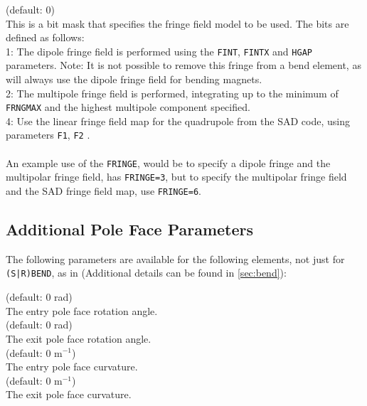 \begin{madlist}
   (default: 0) \\
  This is a bit mask that specifies the fringe field model to be used.
  The bits are defined as follows:\\

  1: The dipole fringe field is performed using the \texttt{FINT}, 
  \texttt{FINTX} and \texttt{HGAP} parameters. 
  Note: It is not possible to remove this fringe from a bend element, as \ptc
  will always use the dipole fringe field for bending magnets.\\

  2: The multipole fringe field is performed, integrating up to the minimum of 
  \texttt{FRNGMAX} and the highest multipole component specified.\\

  4: Use the linear fringe field map for the quadrupole from the SAD code, 
  using parameters \texttt{F1}, \texttt{F2} \cite{sad_quad_2022}. \\ \\


  An example use of the \texttt{FRINGE}, would be to specify a dipole fringe and 
  the multipolar fringe field, has \texttt{FRINGE=3}, but to specify the multipolar
  fringe field and the SAD fringe field map, use \texttt{FRINGE=6}.

\end{madlist}

\subsection{Additional Pole Face Parameters}

The following parameters are available for the following elements, 
not just for \texttt{(S|R)BEND}, as in \madx 
(Additional details can be found in \ref{sec:bend}):


\begin{madlist}
   (default: 0 rad) \\
  The entry pole face rotation angle.\\

   (default: 0 rad) \\
  The exit pole face rotation angle.\\

   (default: 0 m$^{-1}$) \\
  The entry pole face curvature.\\

   (default: 0 m$^{-1}$) \\
  The exit pole face curvature.\\

\end{madlist}

